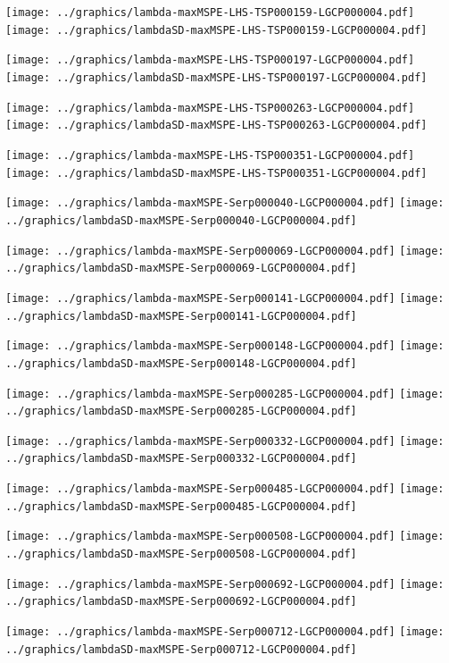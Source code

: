 \documentclass[review]{elsarticle}
\begin{document}
\texttt{[image: ../graphics/lambda-maxMSPE-LHS-TSP000159-LGCP000004.pdf]}
\texttt{[image: ../graphics/lambdaSD-maxMSPE-LHS-TSP000159-LGCP000004.pdf]}

\texttt{[image: ../graphics/lambda-maxMSPE-LHS-TSP000197-LGCP000004.pdf]}
\texttt{[image: ../graphics/lambdaSD-maxMSPE-LHS-TSP000197-LGCP000004.pdf]}

\texttt{[image: ../graphics/lambda-maxMSPE-LHS-TSP000263-LGCP000004.pdf]}
\texttt{[image: ../graphics/lambdaSD-maxMSPE-LHS-TSP000263-LGCP000004.pdf]}

\texttt{[image: ../graphics/lambda-maxMSPE-LHS-TSP000351-LGCP000004.pdf]}
\texttt{[image: ../graphics/lambdaSD-maxMSPE-LHS-TSP000351-LGCP000004.pdf]}

\texttt{[image: ../graphics/lambda-maxMSPE-Serp000040-LGCP000004.pdf]}
\texttt{[image: ../graphics/lambdaSD-maxMSPE-Serp000040-LGCP000004.pdf]}

\texttt{[image: ../graphics/lambda-maxMSPE-Serp000069-LGCP000004.pdf]}
\texttt{[image: ../graphics/lambdaSD-maxMSPE-Serp000069-LGCP000004.pdf]}

\texttt{[image: ../graphics/lambda-maxMSPE-Serp000141-LGCP000004.pdf]}
\texttt{[image: ../graphics/lambdaSD-maxMSPE-Serp000141-LGCP000004.pdf]}

\texttt{[image: ../graphics/lambda-maxMSPE-Serp000148-LGCP000004.pdf]}
\texttt{[image: ../graphics/lambdaSD-maxMSPE-Serp000148-LGCP000004.pdf]}

\texttt{[image: ../graphics/lambda-maxMSPE-Serp000285-LGCP000004.pdf]}
\texttt{[image: ../graphics/lambdaSD-maxMSPE-Serp000285-LGCP000004.pdf]}

\texttt{[image: ../graphics/lambda-maxMSPE-Serp000332-LGCP000004.pdf]}
\texttt{[image: ../graphics/lambdaSD-maxMSPE-Serp000332-LGCP000004.pdf]}

\texttt{[image: ../graphics/lambda-maxMSPE-Serp000485-LGCP000004.pdf]}
\texttt{[image: ../graphics/lambdaSD-maxMSPE-Serp000485-LGCP000004.pdf]}

\texttt{[image: ../graphics/lambda-maxMSPE-Serp000508-LGCP000004.pdf]}
\texttt{[image: ../graphics/lambdaSD-maxMSPE-Serp000508-LGCP000004.pdf]}

\texttt{[image: ../graphics/lambda-maxMSPE-Serp000692-LGCP000004.pdf]}
\texttt{[image: ../graphics/lambdaSD-maxMSPE-Serp000692-LGCP000004.pdf]}

\texttt{[image: ../graphics/lambda-maxMSPE-Serp000712-LGCP000004.pdf]}
\texttt{[image: ../graphics/lambdaSD-maxMSPE-Serp000712-LGCP000004.pdf]}
\end{document}
